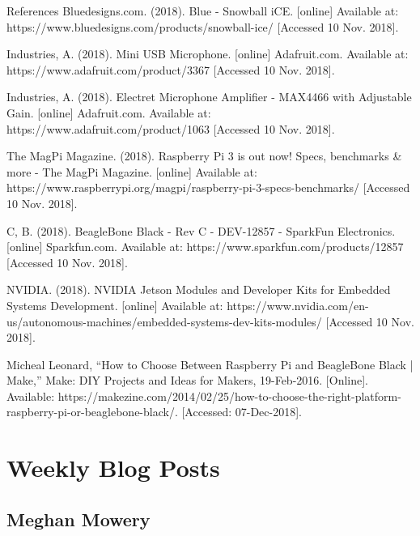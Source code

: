\documentclass[onecolumn, draftclsnofoot,10pt, compsoc]{IEEEtran}
\begin{document}
\begin{Sarahi-techreview-bib}{References}
 Bluedesigns.com. (2018). Blue - Snowball iCE. [online] Available at: https://www.bluedesigns.com/products/snowball-ice/ [Accessed 10 Nov. 2018].

Industries, A. (2018). Mini USB Microphone. [online] Adafruit.com. Available at: https://www.adafruit.com/product/3367 [Accessed 10 Nov. 2018].

Industries, A. (2018). Electret Microphone Amplifier - MAX4466 with Adjustable Gain. [online] Adafruit.com. Available at: https://www.adafruit.com/product/1063 [Accessed 10 Nov. 2018].

The MagPi Magazine. (2018). Raspberry Pi 3 is out now! Specs, benchmarks & more - The MagPi Magazine. [online] Available at: https://www.raspberrypi.org/magpi/raspberry-pi-3-specs-benchmarks/ [Accessed 10 Nov. 2018].

 C, B. (2018). BeagleBone Black - Rev C - DEV-12857 - SparkFun Electronics. [online] Sparkfun.com. Available at: https://www.sparkfun.com/products/12857 [Accessed 10 Nov. 2018].

NVIDIA. (2018). NVIDIA Jetson Modules and Developer Kits for Embedded Systems Development. [online] Available at: https://www.nvidia.com/en-us/autonomous-machines/embedded-systems-dev-kits-modules/ [Accessed 10 Nov. 2018].

Micheal Leonard, “How to Choose Between Raspberry Pi and BeagleBone Black | Make,” Make: DIY Projects and Ideas for Makers, 19-Feb-2016. [Online]. Available: https://makezine.com/2014/02/25/how-to-choose-the-right-platform-raspberry-pi-or-beaglebone-black/. [Accessed: 07-Dec-2018].
\end{Sarahi-techreview-bib}
\newpage

\section{Weekly Blog Posts}

\subsection{Meghan Mowery}
\end{document}
